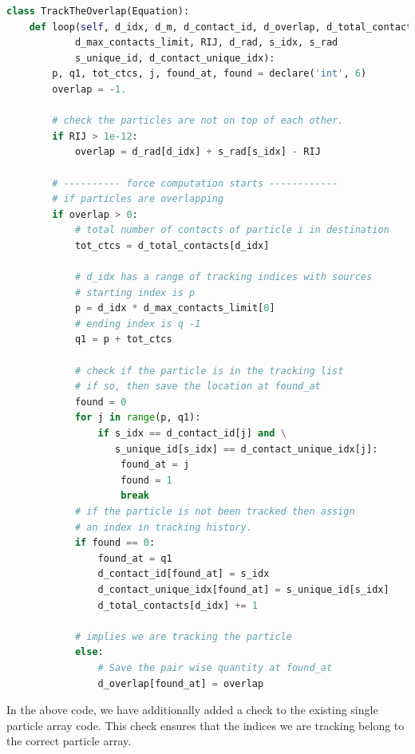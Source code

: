 \begin{lstlisting}[label={contact:equations},frame=lines,language=Python,upquote=True]
class TrackTheOverlap(Equation):
    def loop(self, d_idx, d_m, d_contact_id, d_overlap, d_total_contacts,
            d_max_contacts_limit, RIJ, d_rad, s_idx, s_rad
            s_unique_id, d_contact_unique_idx):
        p, q1, tot_ctcs, j, found_at, found = declare('int', 6)
        overlap = -1.

        # check the particles are not on top of each other.
        if RIJ > 1e-12:
            overlap = d_rad[d_idx] + s_rad[s_idx] - RIJ

        # ---------- force computation starts ------------
        # if particles are overlapping
        if overlap > 0:
            # total number of contacts of particle i in destination
            tot_ctcs = d_total_contacts[d_idx]

            # d_idx has a range of tracking indices with sources
            # starting index is p
            p = d_idx * d_max_contacts_limit[0]
            # ending index is q -1
            q1 = p + tot_ctcs

            # check if the particle is in the tracking list
            # if so, then save the location at found_at
            found = 0
            for j in range(p, q1):
                if s_idx == d_contact_id[j] and \
                   s_unique_id[s_idx] == d_contact_unique_idx[j]:
                    found_at = j
                    found = 1
                    break
            # if the particle is not been tracked then assign
            # an index in tracking history.
            if found == 0:
                found_at = q1
                d_contact_id[found_at] = s_idx
                d_contact_unique_idx[found_at] = s_unique_id[s_idx]
                d_total_contacts[d_idx] += 1

            # implies we are tracking the particle
            else:
                # Save the pair wise quantity at found_at
                d_overlap[found_at] = overlap
\end{lstlisting}
In the above code, we have additionally added a check to the existing single
particle array code. This check ensures that the indices we are tracking belong
to the correct particle array.


\FloatBarrier%

